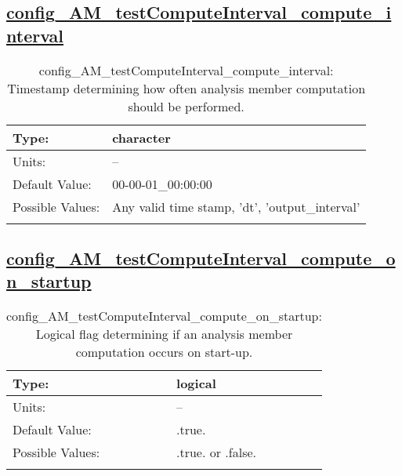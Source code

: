 \subsection[config\_AM\_testComputeInterval\_compute\_interval]{\hyperref[sec:nm_tab_AM_testComputeInterval]{config\_AM\_testComputeInterval\_compute\_interval}}
\label{subsec:nm_sec_config_AM_testComputeInterval_compute_interval}
\begin{center}
\begin{longtable}{| p{2.0in} || p{4.0in} |}
    \hline
    Type: & character \\
    \hline
    Units: & -- \\
    \hline
    Default Value: & 00-00-01\_00:00:00 \\
    \hline
    Possible Values: & Any valid time stamp, 'dt', 'output\_interval' \\
    \hline
    \caption{config\_AM\_testComputeInterval\_compute\_interval: Timestamp determining how often analysis member computation should be performed.}
\end{longtable}
\end{center}
\subsection[config\_AM\_testComputeInterval\_compute\_on\_startup]{\hyperref[sec:nm_tab_AM_testComputeInterval]{config\_AM\_testComputeInterval\_compute\_on\_startup}}
\label{subsec:nm_sec_config_AM_testComputeInterval_compute_on_startup}
\begin{center}
\begin{longtable}{| p{2.0in} || p{4.0in} |}
    \hline
    Type: & logical \\
    \hline
    Units: & -- \\
    \hline
    Default Value: & .true. \\
    \hline
    Possible Values: & .true. or .false. \\
    \hline
    \caption{config\_AM\_testComputeInterval\_compute\_on\_startup: Logical flag determining if an analysis member computation occurs on start-up.}
\end{longtable}
\end{center}
